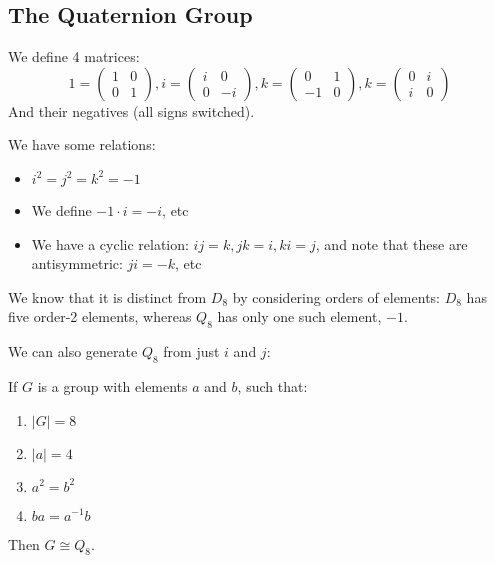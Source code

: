 \documentclass[../Main.tex]{subfiles}
\begin{document}
\subsection{The Quaternion Group}
We define 4 matrices:
\begin{equation*}
    1 =
    \begin{pmatrix}
        1 & 0 \\
        0 & 1
    \end{pmatrix},
    i = 
    \begin{pmatrix}
        i & 0 \\
        0 & -i
    \end{pmatrix},
    k = 
    \begin{pmatrix}
        0 & 1 \\
        -1 & 0
    \end{pmatrix},
    k = 
    \begin{pmatrix}
        0 & i \\
        i & 0
    \end{pmatrix}
\end{equation*}
And their negatives (all signs switched).\par
We have some relations:
\begin{itemize}
    \item $i^2 = j^2 = k^2 = -1$
    \item We define $-1 \cdot i = -i$, etc
    \item We have a cyclic relation: $ij = k, jk = i, ki = j$, and note that these are antisymmetric: $ji = -k$, etc
\end{itemize}
We know that it is distinct from $D_8$ by considering orders of elements: $D_8$ has five order-2 elements, whereas $Q_8$ has only one such element, $-1$.\par
We can also generate $Q_8$ from just $i$ and $j$:
\begin{lemma}
    If $G$ is a group with elements $a$ and $b$, such that:
    \begin{enumerate}
        \item $|G| = 8$
        \item $|a| = 4$
        \item $a^2 = b^2$
        \item $ba = a^{-1}b$
    \end{enumerate}
    Then $G \cong Q_8$.
    \label{lemQ8Isomorphism}
\end{lemma}
\end{document}
